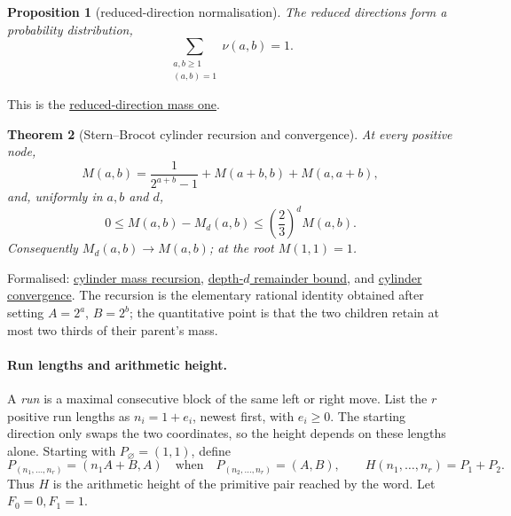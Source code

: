 \documentclass[11pt]{article}
\newcommand{\commit}{ebc98ee71f6819bd9fe344a0bb343542c604e533}
\newcommand{\repobase}{https://github.com/wcook04/plectis-lean-erdos249-257/blob/\commit}
\newcommand{\PK}{Erdos249257}
\newcommand{\lword}[4]{\href{\repobase/\PK/#1\#L#2}{#4}}
\newtheorem{theorem}{Theorem}[section]
\newtheorem{proposition}[theorem]{Proposition}
\theoremstyle{definition}
\theoremstyle{remark}
\begin{document}
{\begin{proposition}[reduced-direction normalisation]\label{res:directionnormalization}
The reduced directions form a probability distribution,
\[
  \sum_{\substack{a,b\ge1\\(a,b)=1}}\nu(a,b)=1.
\]
\end{proposition}
\noindent This is the
\lword{GcdMomentCalculus.lean}{349}{tsum_pos_coprime_inv_mersenne_eq_one}{reduced-direction mass one}.

\begin{theorem}[Stern--Brocot cylinder recursion and convergence]
\label{res:sternbrocotcylinders}
At every positive node,
\[
  M(a,b)=\frac1{2^{a+b}-1}+M(a+b,b)+M(a,a+b),
\]
and, uniformly in \(a,b\) and \(d\),
\[
  0\le M(a,b)-M_d(a,b)
  \le \left(\frac23\right)^d M(a,b).
\]
Consequently \(M_d(a,b)\to M(a,b)\); at the root \(M(1,1)=1\).
\end{theorem}
\noindent Formalised:
\lword{GcdMomentCalculus.lean}{474}{cylinderMass_split}{cylinder mass recursion},
\lword{GcdMomentCalculus.lean}{525}{sternBrocotDepthMass_error}{depth-$d$ remainder bound}, and
\lword{GcdMomentCalculus.lean}{560}{tendsto_sternBrocotDepthMass}{cylinder convergence}.
The recursion is the elementary rational identity obtained after setting
\(A=2^a\), \(B=2^b\); the quantitative point is that the two children retain
at most two thirds of their parent's mass.

\paragraph{Run lengths and arithmetic height.}
A \emph{run} is a maximal consecutive block of the same left or right move.
List the $r$ positive run lengths as $n_i=1+e_i$, newest first, with $e_i\ge0$.
The starting direction only swaps the two coordinates, so the height depends
on these lengths alone.  Starting with \(P_\varnothing=(1,1)\), define
\[
  P_{(n_1,\ldots,n_r)}=(n_1A+B,A)
  \quad\text{when}\quad P_{(n_2,\ldots,n_r)}=(A,B),
  \qquad H(n_1,\ldots,n_r)=P_1+P_2.
\]
Thus \(H\) is the arithmetic height of the primitive pair reached by the
word.  Let \(F_0=0,F_1=1\).

}
\end{document}
